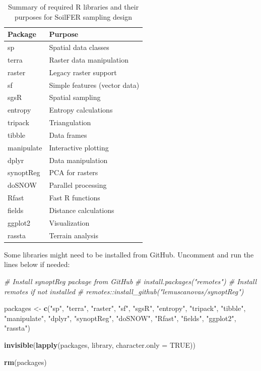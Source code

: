 \documentclass[
  10pt,
  b5paper,
  oneside]{book}
\newenvironment{Shaded}{\begin{snugshade}}{\end{snugshade}}
\newcommand{\AttributeTok}[1]{\textcolor[rgb]{0.13,0.29,0.53}{#1}}
\newcommand{\CommentTok}[1]{\textcolor[rgb]{0.56,0.35,0.01}{\textit{#1}}}
\newcommand{\ConstantTok}[1]{\textcolor[rgb]{0.56,0.35,0.01}{#1}}
\newcommand{\FunctionTok}[1]{\textcolor[rgb]{0.13,0.29,0.53}{\textbf{#1}}}
\newcommand{\NormalTok}[1]{#1}
\newcommand{\OtherTok}[1]{\textcolor[rgb]{0.56,0.35,0.01}{#1}}
\newcommand{\StringTok}[1]{\textcolor[rgb]{0.31,0.60,0.02}{#1}}
\begin{document}
\begin{table}

\caption{\label{tab:r-libraries}Summary of required R libraries and their purposes for SoilFER sampling design}
\centering
\begin{tabular}[t]{l|l}
\hline
Package & Purpose\\
\hline
sp & Spatial data classes\\
\hline
terra & Raster data manipulation\\
\hline
raster & Legacy raster support\\
\hline
sf & Simple features (vector data)\\
\hline
sgsR & Spatial sampling\\
\hline
entropy & Entropy calculations\\
\hline
tripack & Triangulation\\
\hline
tibble & Data frames\\
\hline
manipulate & Interactive plotting\\
\hline
dplyr & Data manipulation\\
\hline
synoptReg & PCA for rasters\\
\hline
doSNOW & Parallel processing\\
\hline
Rfast & Fast R functions\\
\hline
fields & Distance calculations\\
\hline
ggplot2 & Visualization\\
\hline
rassta & Terrain analysis\\
\hline
\end{tabular}
\end{table}

Some libraries might need to be installed from GitHub. Uncomment and run the lines below if needed:

\begin{Shaded}
\begin{Highlighting}[]
\CommentTok{\# Install synoptReg package from GitHub}
\CommentTok{\# install.packages("remotes") \# Install remotes if not installed}
\CommentTok{\# remotes::install\_github("lemuscanovas/synoptReg")}

\NormalTok{packages }\OtherTok{\textless{}{-}} \FunctionTok{c}\NormalTok{(}\StringTok{"sp"}\NormalTok{, }\StringTok{"terra"}\NormalTok{, }\StringTok{"raster"}\NormalTok{, }\StringTok{"sf"}\NormalTok{, }\StringTok{"sgsR"}\NormalTok{, }\StringTok{"entropy"}\NormalTok{, }
              \StringTok{"tripack"}\NormalTok{, }\StringTok{"tibble"}\NormalTok{, }\StringTok{"manipulate"}\NormalTok{, }\StringTok{"dplyr"}\NormalTok{, }\StringTok{"synoptReg"}\NormalTok{, }
              \StringTok{"doSNOW"}\NormalTok{, }\StringTok{"Rfast"}\NormalTok{, }\StringTok{"fields"}\NormalTok{, }\StringTok{"ggplot2"}\NormalTok{, }\StringTok{"rassta"}\NormalTok{)}

\FunctionTok{invisible}\NormalTok{(}\FunctionTok{lapply}\NormalTok{(packages, library, }\AttributeTok{character.only =} \ConstantTok{TRUE}\NormalTok{))}

\FunctionTok{rm}\NormalTok{(packages)}
\end{Highlighting}
\end{Shaded}
\end{document}

